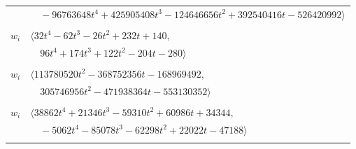 \documentclass[11pt]{article}
\begin{document}
\begin{longtable}{@{}ll@{}}
 & $\quad -96763648t^{4}+425905408t^{3}-124646656t^{2}+392540416t-526420992\rangle$\\
\addlinespace[2pt]
\multicolumn{2}{@{}p{0.97\textwidth}@{}}{$i=63$, $D_i=1$, $\rho_{ij}$: $5{:}1, \allowbreak 7{:}1, \allowbreak 12{:}3, \allowbreak 13{:}2, \allowbreak 15{:}3, \allowbreak 20{:}2, \allowbreak 30{:}2, \allowbreak 31{:}2, \allowbreak 38{:}3, \allowbreak 47{:}3, \allowbreak 54{:}3, \allowbreak 57{:}3, \allowbreak 72{:}1$}\\
$w_i$ & $\langle 32t^{4}-62t^{3}-26t^{2}+232t+140,$\\
 & $\quad 96t^{4}+174t^{3}+122t^{2}-204t-280\rangle$\\
\addlinespace[2pt]
\multicolumn{2}{@{}p{0.97\textwidth}@{}}{$i=64$, $D_i=1$, $\rho_{ij}$: $6{:}1, \allowbreak 9{:}2, \allowbreak 12{:}3, \allowbreak 14{:}3, \allowbreak 16{:}3, \allowbreak 17{:}3, \allowbreak 18{:}1, \allowbreak 21{:}3, \allowbreak 25{:}3, \allowbreak 26{:}2, \allowbreak 28{:}1, \allowbreak 33{:}2, \allowbreak 34{:}3, \allowbreak 35{:}2, \allowbreak 36{:}1, \allowbreak 37{:}2, \allowbreak 38{:}2, \allowbreak 39{:}1, \allowbreak 42{:}2, \allowbreak 46{:}2, \allowbreak 51{:}2, \allowbreak 56{:}2, \allowbreak 57{:}1, \allowbreak 60{:}2, \allowbreak 61{:}3, \allowbreak 65{:}1, \allowbreak 66{:}3, \allowbreak 72{:}3, \allowbreak 78{:}2$}\\
$w_i$ & $\langle 113780520t^{2}-368752356t-168969492,$\\
 & $\quad 305746956t^{2}-471938364t-553130352\rangle$\\
\addlinespace[2pt]
\multicolumn{2}{@{}p{0.97\textwidth}@{}}{$i=65$, $D_i=1$, $\rho_{ij}$: $3{:}1, \allowbreak 7{:}2, \allowbreak 15{:}2, \allowbreak 16{:}1, \allowbreak 18{:}2, \allowbreak 20{:}1, \allowbreak 21{:}2, \allowbreak 26{:}2, \allowbreak 29{:}3, \allowbreak 32{:}3, \allowbreak 36{:}3, \allowbreak 38{:}2, \allowbreak 45{:}2, \allowbreak 48{:}2, \allowbreak 53{:}1, \allowbreak 58{:}3, \allowbreak 64{:}3, \allowbreak 67{:}3, \allowbreak 72{:}1, \allowbreak 76{:}2$}\\
$w_i$ & $\langle 38862t^{4}+21346t^{3}-59310t^{2}+60986t+34344,$\\
 & $\quad -5062t^{4}-85078t^{3}-62298t^{2}+22022t-47188\rangle$\\
\addlinespace[2pt]
\multicolumn{2}{@{}p{0.97\textwidth}@{}}{$i=66$, $D_i=2$, $e_i=1$, $\rho_{ij}$: $1{:}1, \allowbreak 5{:}1, \allowbreak 6{:}2, \allowbreak 12{:}2, \allowbreak 14{:}3, \allowbreak 20{:}1, \allowbreak 21{:}3, \allowbreak 23{:}1, \allowbreak 26{:}3, \allowbreak 31{:}1, \allowbreak 33{:}2, \allowbreak 36{:}3, \allowbreak 37{:}1, \allowbreak 38{:}2, \allowbreak 41{:}2, \allowbreak 45{:}2, \allowbreak 48{:}2, \allowbreak 50{:}3, \allowbreak 59{:}3, \allowbreak 64{:}1, \allowbreak 73{:}1, \allowbreak 74{:}1, \allowbreak 81{:}2$}\\

\end{longtable}
\end{document}
